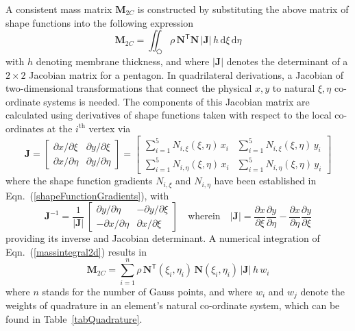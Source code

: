 A consistent mass matrix $\mathbf{M}_{2C}$ is constructed by substituting the above matrix of shape functions into the following expression
\begin{equation}
    \mathbf{M}_{2C} = \iint_{\pentagon} \rho \, \mathbf{N}^{\mathsf{T}} \mathbf{N} \,|\mathbf{J}| \, h \, \mathrm{d} \xi \, \mathrm{d} \eta
    \label{massintegral2d}
\end{equation}
with $h$ denoting membrane thickness, and where $|\mathbf{J}|$ denotes the determinant of a $2 \! \times \! 2$ Jacobian matrix for a pentagon.  In quadrilateral derivations, a Jacobian of two-dimensional transformations that connect the physical ${x, y}$ to natural ${\xi, \eta}$ co-ordinate systems is needed.  The components of this Jacobian matrix are calculated using derivatives of shape functions taken with respect to the local co-ordinates at the $i^{\mathrm{th}}$ vertex via
\begin{equation}
\mathbf{J} = 
\begin{bmatrix}
\partial x / \partial\xi & \partial y / \partial\xi \\
\partial x / \partial\eta & \partial y / \partial\eta 
\end{bmatrix}  
= \begin{bmatrix}
\sum\nolimits_{i=1}^5 N_{i,\xi} (\xi,\eta) \, x_i & \sum\nolimits_{i=1}^5 N_{i,\xi} (\xi,\eta) \, y_i \\
\sum\nolimits_{i=1}^5 N_{i,\eta} (\xi,\eta) \, x_i & \sum\nolimits_{i=1}^5 N_{i,\eta} (\xi,\eta) \, y_i
\end{bmatrix}
\end{equation}
where the shape function gradients $N_{i,\xi}$ and $N_{i,\eta}$ have been established in Eqn.~(\ref{shapeFunctionGradients}), with
\begin{equation}
\mathbf{J}^{-1}  = \frac{1}{|\mathbf{J}|} \,
\begin{bmatrix}
\partial y / \partial\eta & - \partial y / \partial\xi \\
- \partial x / \partial\eta & \partial x / \partial\xi
\end{bmatrix} 
\quad \text{wherein} \quad 
| \mathbf{J} | = \frac{\partial x}{\partial \xi} \frac{\partial y}{\partial \eta} - 
\frac{\partial x}{\partial \eta} \frac{\partial y}{\partial \xi}
\label{jacobianpent}
\end{equation}
providing its inverse and Jacobian determinant.  A numerical integration of Eqn.~(\ref{massintegral2d}) results in 
\begin{equation}
    \mathbf{M}_{2C} = \sum_{i=1}^{n} \rho \, \mathbf{N}^{\mathsf{T}} ( \xi_i , \eta_i ) \, \mathbf{N} ( \xi_i , \eta_i ) \,|\mathbf{J}| \, h \, w_i
\end{equation}
where $n$ stands for the number of Gauss points, and where $w_i$ and $w_j$ denote the weights of quadrature in an element's natural co-ordinate system, which can be found in Table~\ref{tabQuadrature}.

